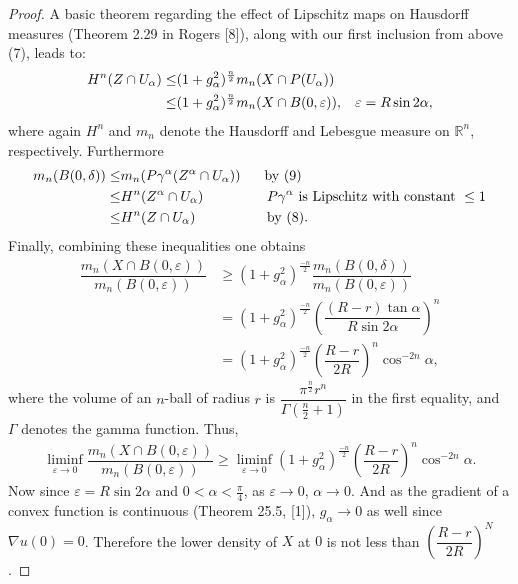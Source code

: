 \documentclass[10pt]{article}
\begin{document}
\begin{proof}
A basic theorem regarding the effect of Lipschitz maps on Hausdorff measures (Theorem 2.29 in Rogers [8]), along with our first inclusion from above (7), leads to:
\begin{align*}
H^{n}(Z\cap U_{\alpha})\leq & (1+g_{\alpha}^{2})^{\frac{n}{2}}m_{n}(X\cap P(U_{\alpha}))\\
\leq & (1+g_{\alpha}^{2})^{\frac{n}{2}}m_{n}(X\cap B(0,\varepsilon)),\hspace{3mm} \varepsilon = R\sin 2\alpha,
\end{align*} where again $H^n$ and $m_n$ denote the Hausdorff and Lebesgue measure on $\mathbb{R}^n$, respectively.
Furthermore
\begin{align*}
m_{n}(B(0,\delta)) \leq & m_{n}(P\gamma^{\alpha}(Z^{\alpha}\cap U_{\alpha})) \hspace{6mm} \text{by } (9)\\
\leq & H^{n}(Z^{\alpha}\cap U_{\alpha}) \hspace{16mm} P\gamma^{\alpha} \text{ is Lipschitz with constant }\leq 1\\
\leq & H^{n}(Z\cap U_{\alpha}) \hspace{18mm} \text{by } (8).
\end{align*}
Finally, combining these inequalities one obtains
\begin{align*}
\dfrac{m_{n}(X\cap B(0,\varepsilon))}{m_{n}(B(0,\varepsilon))}&\geq(1+g_{\alpha}^{2})^{\frac{-n}{2}}\dfrac{m_{n}( B(0,\delta))}{m_{n}(B(0,\varepsilon))}\\
&=(1+g_{\alpha}^{2})^{\frac{-n}{2}} \left(\dfrac{(R-r)\tan \alpha}{R \sin 2\alpha}\right)^{n}\\
&=(1+g_{\alpha}^{2})^{\frac{-n}{2}} \left(\dfrac{R-r}{2R }\right)^{n} \cos^{-2n}\alpha,
\end{align*}
where the volume of an $n$-ball of radius $r$ is $\dfrac{\pi^{\frac{n}{2}}r^{n}}{\Gamma (\frac{n}{2}+1)}$ in the first equality, and $\Gamma$ denotes the gamma function. Thus,
\begin{align*}
\liminf_{\varepsilon\rightarrow 0}\dfrac{m_{n}(X\cap B(0,\varepsilon))}{m_{n}(B(0,\varepsilon))} \geq \liminf_{\varepsilon\rightarrow 0} (1+g_{\alpha}^{2})^{\frac{-n}{2}} \left(\dfrac{R-r}{2R }\right)^{n} \cos^{-2n}\alpha.
\end{align*}
Now since $\varepsilon = R\sin 2\alpha$ and $0<\alpha<\frac{\pi}{4}$, as $\varepsilon\rightarrow 0$, $\alpha\rightarrow 0$. And as the gradient of a convex function is continuous (Theorem 25.5, [1]), $g_{\alpha}\rightarrow 0$ as well since $\nabla u(0)=0$. Therefore the lower density of $X$ at $0$ is not less than $\left(\dfrac{R-r}{2R }\right)^{N}$. 
\end{proof}
\end{document}
